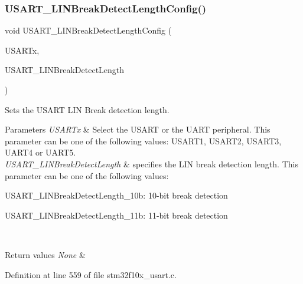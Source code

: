 \subsubsection{\texorpdfstring{U\+S\+A\+R\+T\+\_\+\+L\+I\+N\+Break\+Detect\+Length\+Config()}{USART\_LINBreakDetectLengthConfig()}}
{\footnotesize\ttfamily void U\+S\+A\+R\+T\+\_\+\+L\+I\+N\+Break\+Detect\+Length\+Config (\begin{DoxyParamCaption}\item[{\hyperlink{struct_u_s_a_r_t___type_def}{U\+S\+A\+R\+T\+\_\+\+Type\+Def} $\ast$}]{U\+S\+A\+R\+Tx,  }\item[{uint16\+\_\+t}]{U\+S\+A\+R\+T\+\_\+\+L\+I\+N\+Break\+Detect\+Length }\end{DoxyParamCaption})}



Sets the U\+S\+A\+RT L\+IN Break detection length. 


\begin{DoxyParams}{Parameters}
{\em U\+S\+A\+R\+Tx} & Select the U\+S\+A\+RT or the U\+A\+RT peripheral. This parameter can be one of the following values\+: U\+S\+A\+R\+T1, U\+S\+A\+R\+T2, U\+S\+A\+R\+T3, U\+A\+R\+T4 or U\+A\+R\+T5. \\
\hline
{\em U\+S\+A\+R\+T\+\_\+\+L\+I\+N\+Break\+Detect\+Length} & specifies the L\+IN break detection length. This parameter can be one of the following values\+: \begin{DoxyItemize}
\item U\+S\+A\+R\+T\+\_\+\+L\+I\+N\+Break\+Detect\+Length\+\_\+10b\+: 10-\/bit break detection \item U\+S\+A\+R\+T\+\_\+\+L\+I\+N\+Break\+Detect\+Length\+\_\+11b\+: 11-\/bit break detection \end{DoxyItemize}
\\
\hline
\end{DoxyParams}

\begin{DoxyRetVals}{Return values}
{\em None} & \\
\hline
\end{DoxyRetVals}


Definition at line 559 of file stm32f10x\+\_\+usart.\+c.

\mbox{\label{group___u_s_a_r_t___private___functions_ga9fdd6296f4ca4acdfcbd58bf56bd4185}} 
